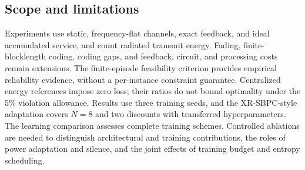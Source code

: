 \subsection{Scope and limitations}
Experiments use static, frequency-flat channels, exact feedback, and ideal
accumulated service, and count radiated transmit energy. Fading,
finite-blocklength coding, coding gaps, and feedback, circuit, and processing
costs remain extensions. The finite-episode feasibility criterion provides
empirical reliability evidence, without a per-instance constraint guarantee.
Centralized energy references impose zero loss; their ratios do not bound
optimality under the 5\% violation allowance. Results use three training
seeds, and the XR-SBPC-style adaptation covers $N=8$ and two discounts with
transferred hyperparameters. The learning comparison assesses complete
training schemes. Controlled ablations are needed to distinguish architectural
and training contributions, the roles of power adaptation and silence,
and the joint effects of training budget and entropy scheduling.
